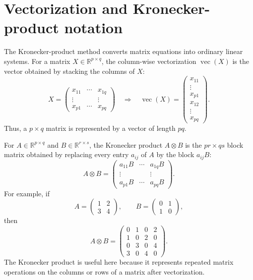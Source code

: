 \documentclass[11pt]{article}
\begin{document}
\section{Vectorization and Kronecker-product notation}
\label{a:sec:kronecker-notation}
The Kronecker-product method converts matrix equations into ordinary linear
systems. For a matrix $X\in\mathbb{R}^{p\times q}$, the column-wise vectorization
$\operatorname{vec}(X)$ is the vector obtained by stacking the columns of $X$:
\begin{equation}
    X=\begin{pmatrix}
        x_{11} & \cdots & x_{1q} \\
        \vdots &        & \vdots \\
        x_{p1} & \cdots & x_{pq}
    \end{pmatrix}
    \quad\Longrightarrow\quad
    \operatorname{vec}(X)=
    \begin{pmatrix}
        x_{11} \\
        \vdots \\
        x_{p1} \\
        x_{12} \\
        \vdots \\
        x_{pq}
    \end{pmatrix}.
\end{equation}
Thus, a $p\times q$ matrix is represented by a vector of length $pq$.

For $A\in\mathbb{R}^{p\times q}$ and $B\in\mathbb{R}^{r\times s}$, the
Kronecker product $A\otimes B$ is the $pr\times qs$ block matrix obtained by
replacing every entry $a_{ij}$ of $A$ by the block $a_{ij}B$:
\begin{equation}
    A\otimes B
    =\begin{pmatrix}
        a_{11}B & \cdots & a_{1q}B \\
        \vdots  &        & \vdots  \\
        a_{p1}B & \cdots & a_{pq}B
    \end{pmatrix}.
\end{equation}
For example, if
\begin{equation}
    A=\begin{pmatrix}1&2\\3&4\end{pmatrix},
    \qquad
    B=\begin{pmatrix}0&1\\1&0\end{pmatrix},
\end{equation}
then
\begin{equation}
    A\otimes B
    =\begin{pmatrix}
        0 & 1 & 0 & 2 \\
        1 & 0 & 2 & 0 \\
        0 & 3 & 0 & 4 \\
        3 & 0 & 4 & 0
    \end{pmatrix}.
\end{equation}
The Kronecker product is useful here because it represents repeated matrix
operations on the columns or rows of a matrix after vectorization.
\end{document}
